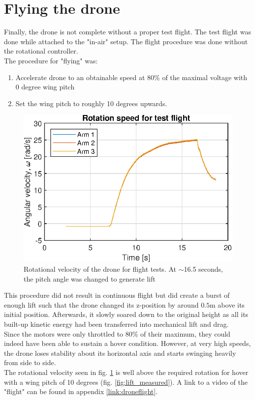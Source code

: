 \section{Flying the drone}\label{chap:flydrone}
Finally, the drone is not complete without a proper test flight. The test flight was done while attached to the "in-air" setup. The flight procedure was done without the rotational controller. \\
The procedure for "flying" was:
\begin{enumerate}
    \item Accelerate drone to an obtainable speed at 80\% of the maximal voltage with 0 degree wing pitch
    \item Set the wing pitch to roughly 10 degrees upwards.
\end{enumerate}
\begin{figure}[h]
    \centering
    \includegraphics{figures/results/flight_rotational_velocity.eps}
    \caption{Rotational velocity of the drone for flight tests. At $\sim$16.5 seconds, the pitch angle was changed to generate lift}
    \label{fig:rotationflight}
\end{figure}
This procedure did not result in continuous flight but did create a burst of enough lift such that the drone changed its z-position by around $0.5$m above its initial position. Afterwards, it slowly soared down to the original height as all its built-up kinetic energy had been transferred into mechanical lift and drag.\\
Since the motors were only throttled to 80\% of their maximum, they could indeed have been able to sustain a hover condition. However, at very high speeds, the drone loses stability about its horizontal axis and starts swinging heavily from side to side.\\
The rotational velocity seen in fig. \ref{fig:rotationflight} is well above the required rotation for hover with a wing pitch of 10 degrees (fig. \ref{fig:lift_measured}).
A link to a video of the "flight" can be found in appendix \ref{link:droneflight}. 



